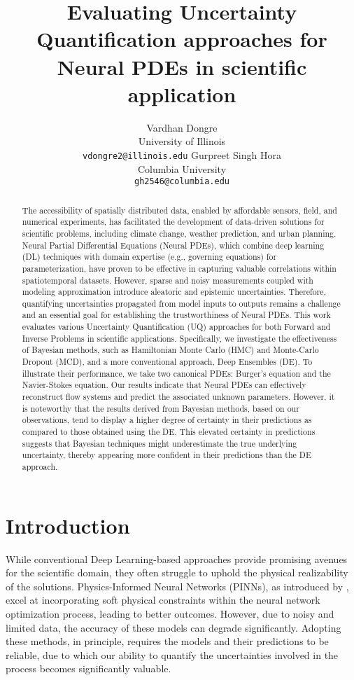 \documentclass{article}
\title{Evaluating Uncertainty Quantification approaches for Neural PDEs in scientific application}
\author{Vardhan Dongre\\ University of Illinois \\ \texttt{vdongre2@illinois.edu} \And Gurpreet Singh Hora \\ Columbia University\\ \texttt{gh2546@columbia.edu}}
\begin{document}
\maketitle

\begin{abstract}

The accessibility of spatially distributed data, enabled by affordable sensors, field, and numerical experiments, has facilitated the development of data-driven solutions for scientific problems, including climate change, weather prediction, and urban planning. Neural Partial Differential Equations (Neural PDEs), which combine deep learning (DL) techniques with domain expertise (e.g., governing equations) for parameterization, have proven to be effective in capturing valuable correlations within spatiotemporal datasets. However, sparse and noisy measurements coupled with modeling approximation introduce aleatoric and epistemic uncertainties. Therefore, quantifying uncertainties propagated from model inputs to outputs remains a challenge and an essential goal for establishing the trustworthiness of Neural PDEs. This work evaluates various Uncertainty Quantification (UQ) approaches for both Forward and Inverse Problems in scientific applications. Specifically, we investigate the effectiveness of Bayesian methods, such as Hamiltonian Monte Carlo (HMC) and Monte-Carlo Dropout (MCD), and a more conventional approach, Deep Ensembles (DE). To illustrate their performance, we take two canonical PDEs: Burger's equation and the Navier-Stokes equation. Our results indicate that Neural PDEs can effectively reconstruct flow systems and predict the associated unknown parameters. However, it is noteworthy that the results derived from Bayesian methods, based on our observations, tend to display a higher degree of certainty in their predictions as compared to those obtained using the DE. This elevated certainty in predictions suggests that Bayesian techniques might underestimate the true underlying uncertainty, thereby appearing more confident in their predictions than the DE approach.
\end{abstract}

\section{Introduction}

While conventional Deep Learning-based approaches provide promising avenues for the scientific domain, they often struggle to uphold the physical realizability of the solutions. Physics-Informed Neural Networks (PINNs), as introduced by \citep{raissi2019physics}, excel at incorporating soft physical constraints within the neural network optimization process, leading to better outcomes. However, due to noisy and limited data, the accuracy of these models can degrade significantly. Adopting these methods, in principle, requires the models and their predictions to be reliable, due to which our ability to quantify the uncertainties involved in the process becomes significantly valuable.
\end{document}
